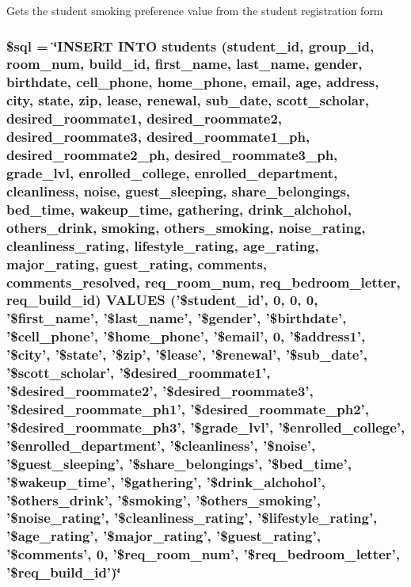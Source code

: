 \-Gets the student smoking preference value from the student registration form \hypertarget{user__view_2validate_2studentVal_8php_a047170d6020a882807665812a27e2525}{
\subsubsection[{\$sql}]{\setlength{\rightskip}{0pt plus 5cm}\$sql = \char`\"{}\-I\-N\-S\-E\-R\-T \-I\-N\-T\-O students (student\-\_\-id, group\-\_\-id, room\-\_\-num, build\-\_\-id, first\-\_\-name, last\-\_\-name, gender, birthdate, cell\-\_\-phone, home\-\_\-phone, email, age, address, city, state, zip, lease, renewal, sub\-\_\-date, scott\-\_\-scholar, desired\-\_\-roommate1, desired\-\_\-roommate2, desired\-\_\-roommate3, desired\-\_\-roommate1\-\_\-ph, desired\-\_\-roommate2\-\_\-ph, desired\-\_\-roommate3\-\_\-ph, grade\-\_\-lvl, enrolled\-\_\-college, enrolled\-\_\-department, cleanliness, noise, guest\-\_\-sleeping, share\-\_\-belongings, bed\-\_\-time, wakeup\-\_\-time, gathering, drink\-\_\-alchohol, others\-\_\-drink, smoking, others\-\_\-smoking, noise\-\_\-rating, cleanliness\-\_\-rating, lifestyle\-\_\-rating, age\-\_\-rating, major\-\_\-rating, guest\-\_\-rating, comments, comments\-\_\-resolved, req\-\_\-room\-\_\-num, req\-\_\-bedroom\-\_\-letter, req\-\_\-build\-\_\-id) \-V\-A\-L\-U\-E\-S ('\$student\-\_\-id', 0, 0, 0, '\$first\-\_\-name', '\$last\-\_\-name', '\$gender', '\$birthdate', '\$cell\-\_\-phone', '\$home\-\_\-phone', '\$email', 0, '\$address1', '\$city', '\$state', '\$zip', '\$lease', '\$renewal', '\$sub\-\_\-date', '\$scott\-\_\-scholar', '\$desired\-\_\-roommate1', '\$desired\-\_\-roommate2', '\$desired\-\_\-roommate3', '\$desired\-\_\-roommate\-\_\-ph1', '\$desired\-\_\-roommate\-\_\-ph2', '\$desired\-\_\-roommate\-\_\-ph3', '\$grade\-\_\-lvl', '\$enrolled\-\_\-college', '\$enrolled\-\_\-department', '\$cleanliness', '\$noise', '\$guest\-\_\-sleeping', '\$share\-\_\-belongings', '\$bed\-\_\-time', '\$wakeup\-\_\-time', '\$gathering', '\$drink\-\_\-alchohol', '\$others\-\_\-drink', '\$smoking', '\$others\-\_\-smoking', '\$noise\-\_\-rating', '\$cleanliness\-\_\-rating', '\$lifestyle\-\_\-rating', '\$age\-\_\-rating', '\$major\-\_\-rating', '\$guest\-\_\-rating', '\$comments', 0, '\$req\-\_\-room\-\_\-num', '\$req\-\_\-bedroom\-\_\-letter', '\$req\-\_\-build\-\_\-id')\char`\"{}}}\label{user__view_2validate_2studentVal_8php_a047170d6020a882807665812a27e2525}
